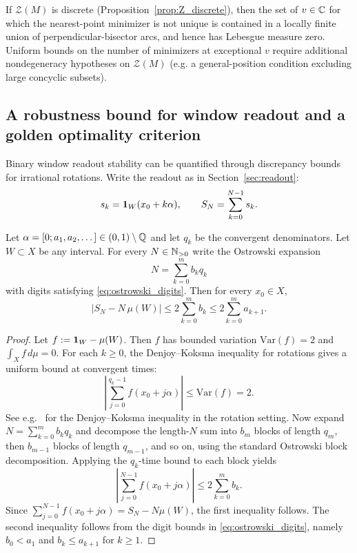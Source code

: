 \begin{remark}
If $\mathcal{Z}(M)$ is discrete (Proposition~\ref{prop:Z_discrete}), then the set of $v\in\mathbb{C}$ for which the nearest-point minimizer is not unique is contained in a locally finite union of perpendicular-bisector arcs, and hence has Lebesgue measure zero.
Uniform bounds on the number of minimizers at exceptional $v$ require additional nondegeneracy hypotheses on $\mathcal{Z}(M)$ (e.g. a general-position condition excluding large concyclic subsets).
\end{remark}

\subsection{A robustness bound for window readout and a golden optimality criterion}
Binary window readout stability can be quantified through discrepancy bounds for irrational rotations.
Write the readout as in Section~\ref{sec:readout}:
$$
s_k=\mathbf{1}_W(x_0+k\alpha),\qquad S_N=\sum_{k=0}^{N-1}s_k.
$$

\begin{theorem}
\label{thm:ostrowski_dk}
Let $\alpha=[0;a_1,a_2,\dots]\in(0,1)\setminus\mathbb{Q}$ and let $q_k$ be the convergent denominators.
Let $W\subset X$ be any interval.
For every $N\in\mathbb{N}_{>0}$ write the Ostrowski expansion
$$
N=\sum_{k=0}^{m} b_{k} q_k
$$
with digits satisfying \eqref{eq:ostrowski_digits}.
Then for every $x_0\in X$,
$$
\bigl|S_N - N\,\mu(W)\bigr|
\le 2\sum_{k=0}^{m} b_{k}
\le 2\sum_{k=0}^{m} a_{k+1}.
$$
\end{theorem}

\begin{proof}
Let $f:=\mathbf{1}_W-\mu(W)$. Then $f$ has bounded variation $\mathrm{Var}(f)=2$ and $\int_X f\,d\mu=0$.
For each $k\ge 0$, the Denjoy--Koksma inequality for rotations gives a uniform bound at convergent times:
$$
\left|\sum_{j=0}^{q_k-1} f(x_0+j\alpha)\right|\le \mathrm{Var}(f)=2.
$$
See e.g.~\cite{KatokHasselblatt1995} for the Denjoy--Koksma inequality in the rotation setting.
Now expand $N=\sum_{k=0}^m b_{k} q_k$ and decompose the length-$N$ sum into $b_{m}$ blocks of length $q_m$, then $b_{m-1}$ blocks of length $q_{m-1}$, and so on, using the standard Ostrowski block decomposition.
Applying the $q_k$-time bound to each block yields
$$
\left|\sum_{j=0}^{N-1} f(x_0+j\alpha)\right|
\le 2\sum_{k=0}^m b_{k}.
$$
Since $\sum_{j=0}^{N-1} f(x_0+j\alpha)=S_N-N\mu(W)$, the first inequality follows.
The second inequality follows from the digit bounds in \eqref{eq:ostrowski_digits}, namely $b_0<a_1$ and $b_k\le a_{k+1}$ for $k\ge 1$.
\end{proof}

